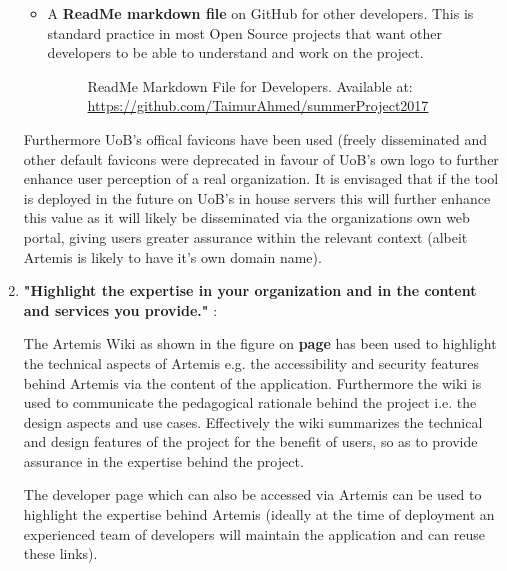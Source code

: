\begin{enumerate}
\begin{itemize}
        \item A \textbf{ReadMe markdown file} on GitHub for other developers. This is standard practice in most Open Source projects that want other developers to be able to understand and work on the project.
            \begin{figure}[H]
                \caption{ReadMe Markdown File for Developers. Available at: \url{https://github.com/TaimurAhmed/summerProject2017}}
            \end{figure}
    \end{itemize}
    
    Furthermore UoB's offical favicons have been used (freely disseminated \cite{UniversityofBristola} and other default favicons were deprecated in favour of UoB's own logo \cite{UniversityofBristola} to further enhance user perception of a real organization. It is envisaged that if the tool is deployed in the future on UoB's in house servers this will further enhance this value as it will likely be disseminated via the organizations own web portal, giving users greater assurance within the relevant context (albeit Artemis is likely to have it's own domain name).


    \newpage    
    \item \textbf{"Highlight the expertise in your organization and in the content and services you provide."} \cite{Fogg2002a}:
    
   
   The Artemis Wiki as shown in the figure on \textbf{page \pageref{wiki}} has been used to highlight the technical aspects of Artemis e.g. the accessibility and security features behind Artemis via the content of the application. Furthermore the wiki is used to communicate the pedagogical rationale behind the project i.e. the design aspects and use cases. Effectively the wiki summarizes the technical and design features of the project for the benefit of users, so as to provide assurance in the expertise behind the project.
   
   The developer page which can also be accessed via Artemis can be used to highlight the expertise behind Artemis (ideally at the time of deployment an experienced team of developers will maintain the application and can reuse these links).
   

\end{enumerate}
